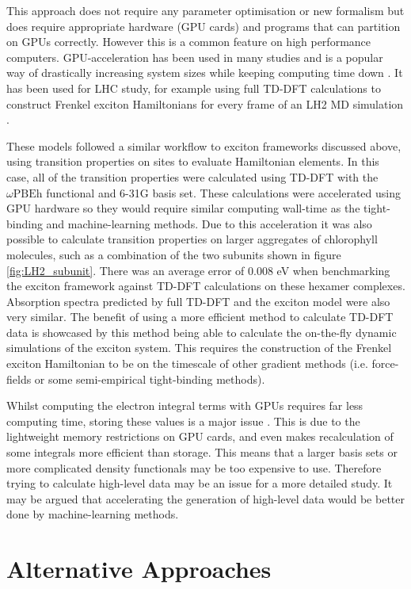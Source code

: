 This approach does not require any parameter optimisation or new formalism but does
require appropriate hardware (GPU cards) and programs that can partition on GPUs
correctly. However this is a common feature on high performance computers. GPU-acceleration
has been used in many studies and is a popular way of drastically increasing system 
sizes while keeping computing time down \cite{Seritan2021}. It has been used for 
LHC study, for example using full TD-DFT calculations to construct Frenkel exciton
Hamiltonians for every frame of an LH2 MD simulation \cite{Sisto2014a, Sisto2017}.

These models followed a similar workflow to exciton frameworks discussed above,
using transition properties on sites to evaluate Hamiltonian elements. In this case, 
all of the transition properties were calculated using TD-DFT with the $\omega\text{PBEh}$
functional and 6-31G basis set. These calculations were accelerated using GPU hardware
so they would require similar computing wall-time as the tight-binding and machine-learning
methods. Due to this acceleration it was also possible to calculate transition properties
on larger aggregates of chlorophyll molecules, such as a combination of the two 
subunits shown in figure \ref{fig:LH2_subunit}. There was an average error of 0.008 eV 
when benchmarking the exciton framework against TD-DFT calculations on these hexamer
complexes\cite{Sisto2014a}. Absorption spectra predicted by full TD-DFT and the
exciton model were also very similar. The benefit of using a more efficient method
to calculate TD-DFT data is showcased by this method being able to calculate the
on-the-fly dynamic simulations of the exciton system. This requires the construction
of the Frenkel exciton Hamiltonian to be on the timescale of other gradient methods
(i.e. force-fields or some semi-empirical tight-binding methods).

Whilst computing the electron integral terms with GPUs requires far less computing 
time, storing these values is a major issue \cite{Sisto2014a}. This is due to the
lightweight memory restrictions on GPU cards, and even makes recalculation of some
integrals more efficient than storage. This means that a larger basis sets or more
complicated density functionals may be too expensive to use. Therefore trying to
calculate high-level data may be an issue for a more detailed study. It may be argued
that accelerating the generation of high-level data would be better done by machine-learning
methods.

\section{Alternative Approaches}
\label{sec:possible_novel_methods}

